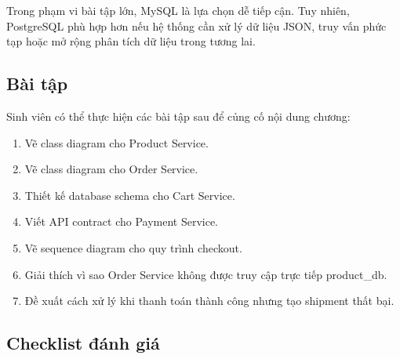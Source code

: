 \documentclass[../main.tex]{subfiles}
\begin{document}
Trong phạm vi bài tập lớn, MySQL là lựa chọn dễ tiếp cận. Tuy nhiên, PostgreSQL phù hợp hơn nếu hệ thống cần xử lý dữ liệu JSON, truy vấn phức tạp hoặc mở rộng phân tích dữ liệu trong tương lai.

\subsection{Bài tập}
\label{subsection:2.10.6}

Sinh viên có thể thực hiện các bài tập sau để củng cố nội dung chương:

\begin{enumerate}
    \item Vẽ class diagram cho Product Service.
    \item Vẽ class diagram cho Order Service.
    \item Thiết kế database schema cho Cart Service.
    \item Viết API contract cho Payment Service.
    \item Vẽ sequence diagram cho quy trình checkout.
    \item Giải thích vì sao Order Service không được truy cập trực tiếp product\_db.
    \item Đề xuất cách xử lý khi thanh toán thành công nhưng tạo shipment thất bại.
\end{enumerate}

\subsection{Checklist đánh giá}
\label{subsection:2.10.7}
\end{document}
